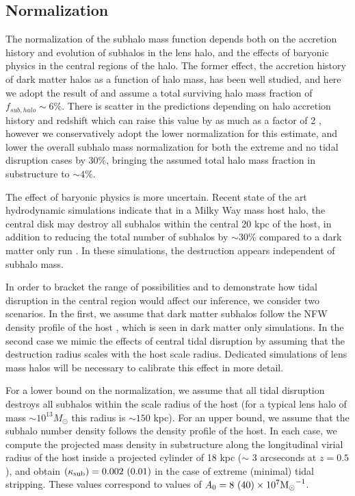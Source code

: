\subsection{Normalization}

The normalization of the subhalo mass function depends both on the accretion history and evolution of subhalos in the lens halo, and the effects of baryonic physics in the central regions of the halo. The former effect, the accretion history of dark matter halos as a function of halo mass, has been well studied, and here we adopt the result of \citep{Han++16} and assume a total surviving halo mass fraction of $f_{sub, halo} \sim 6\%$. There is scatter in the predictions depending on halo accretion history and redshift which can raise this value by as much as a factor of 2 \citep{Fiacconi++16,JiangvdB17}, however we conservatively adopt the lower normalization for this estimate, and lower the overall subhalo mass normalization for both the extreme and no tidal disruption cases by $30\%$, bringing the assumed total halo mass fraction in substructure to $\sim 4\%$.

The effect of baryonic physics is more uncertain. Recent state of the art hydrodynamic simulations indicate that in a Milky Way mass host halo, the central disk may destroy all subhalos within the central 20 kpc of the host, in addition to reducing the total number of subhalos by $\sim30\%$ compared to a dark matter only run \citep{GK++17}. In these simulations, the destruction appears independent of subhalo mass.

In order to bracket the range of possibilities and to demonstrate how tidal disruption in the central region would affect our inference, we consider two scenarios. In the first, we assume that dark matter subhalos follow the NFW density profile of the host \citep{Han++16}, which is seen in dark matter only simulations. In the second case we mimic the effects of central tidal disruption by assuming that the destruction radius scales with the host scale radius. Dedicated simulations of lens mass halos will be necessary to calibrate this effect in more detail.

For a lower bound on the normalization, we assume that all tidal disruption destroys all subhalos within the scale radius of the host (for a typical lens halo of mass $\sim 10^{13}M_{\odot}$ this radius is $\sim 150$ kpc). For an upper bound, we assume that the subhalo number density follows the density profile of the host. In each case, we compute the projected mass density in substructure along the longitudinal virial radius of the host inside a projected cylinder of 18 kpc ($\sim$ 3 arcseconds at $z = 0.5$), and obtain $\left(\kappa_{\rm{sub}}\right) = 0.002 \ (0.01)$ in the case of extreme (minimal) tidal stripping. These values correspond to values of $A_0 =   8 \ (40) \times 10^7 {\rm{M}_{\odot}}^{-1}$.

